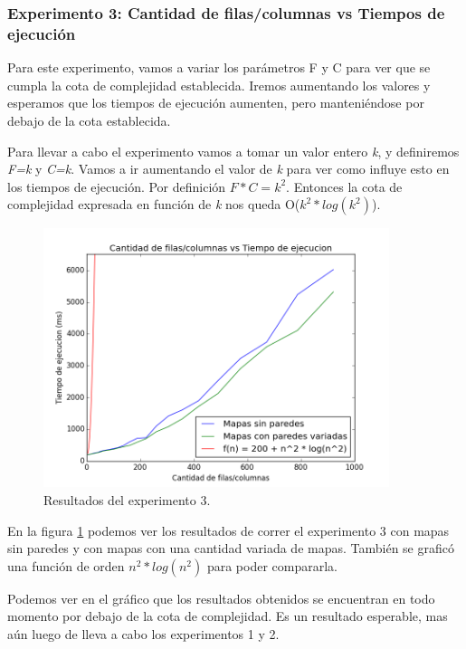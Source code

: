 \subsubsection{Experimento 3: Cantidad de filas/columnas vs Tiempos de ejecución}

\par Para este experimento, vamos a variar los parámetros F y C para ver que se cumpla la cota de complejidad establecida. Iremos aumentando los valores y esperamos que los tiempos de ejecución aumenten, pero manteniéndose por debajo de la cota establecida.

\par Para llevar a cabo el experimento vamos a tomar un valor entero \textit{k}, y definiremos \textit{F=k} y \textit{C=k}. Vamos a ir aumentando el valor de \textit{k} para ver como influye esto en los tiempos de ejecución. Por definición $F*C=k^2$. Entonces la cota de complejidad expresada en función de \textit{k} nos queda O($k^2 * log(k^2)$).

\begin{figure}[H]
  \centering
  \includegraphics[width=0.9\textwidth]{Problema2/img/exp3_filas_columnas.png}
  \caption{Resultados del experimento 3.}
  \label{fig: ej2_exp3_filas_columnas}
\end{figure}

\par En la figura \ref{fig: ej2_exp3_filas_columnas} podemos ver los resultados de correr el experimento 3 con mapas sin paredes y con mapas con una cantidad variada de mapas. También se graficó una función de orden $n^2 * log(n^2)$ para poder compararla.

\par Podemos ver en el gráfico que los resultados obtenidos se encuentran en todo momento por debajo de la cota de complejidad. Es un resultado esperable, mas aún luego de lleva a cabo los experimentos 1 y 2.

